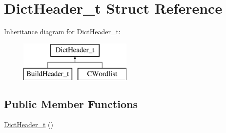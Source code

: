 \hypertarget{structDictHeader__t}{\section{Dict\-Header\-\_\-t Struct Reference}
\label{structDictHeader__t}
}
Inheritance diagram for Dict\-Header\-\_\-t\-:\begin{figure}[H]
\begin{center}
\leavevmode
\includegraphics[height=2.000000cm]{structDictHeader__t}
\end{center}
\end{figure}
\subsection*{Public Member Functions}
\begin{DoxyCompactItemize}
\item 
\hyperlink{structDictHeader__t_a501e4f313a73365ac7ab5aa2e47db43e}{Dict\-Header\-\_\-t} ()
\end{DoxyCompactItemize}

